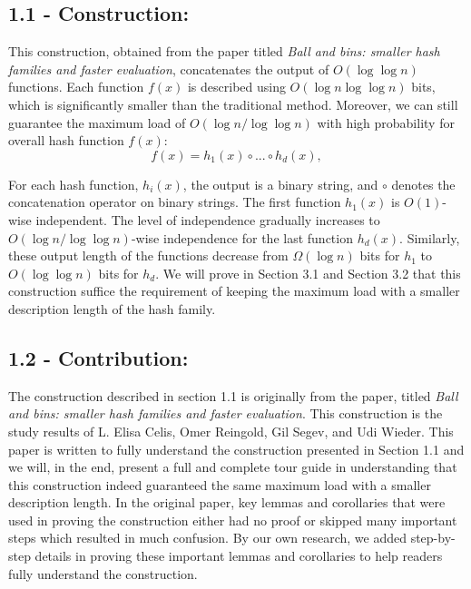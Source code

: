 \documentclass[a4paper, english]{paper}
\begin{document}
	\subsection{1.1 - Construction:}
\quad This construction, obtained from the paper  titled \textit{Ball and bins: smaller hash families and faster evaluation}, concatenates the output of  $O(\log \log n)$ functions. Each function $f(x)$ is described using $O(\log n \log\log n)$ bits, which is significantly smaller than the traditional method. Moreover, we can still guarantee the maximum load of $O(\log n/ \log \log n)$ with high probability for overall hash function $f(x)$:
			$$f(x) = h_1(x) \circ ... \circ h_d(x),$$\par
 For each hash function, $h_i(x)$, the output is a binary string, and $\circ$ denotes the concatenation operator on binary strings. The first function $h_1(x)$ is $O(1)$-wise independent. The level of independence gradually increases to $O(\log n/ \log \log n)$-wise independence for the last function $h_d(x)$. Similarly, these output length of the functions decrease from $\Omega(\log n)$ bits for $h_1$ to $O(\log\log n)$ bits for $h_d$. We will prove in Section 3.1 and Section 3.2 that this construction suffice the requirement of keeping the maximum load with a smaller description length of the hash family. \\
	
	\subsection{1.2 - Contribution:} 
\quad The construction described in section 1.1 is originally from the paper, titled \textit{Ball and bins: smaller hash families and faster evaluation}. This construction is the study results of L. Elisa Celis, Omer Reingold, Gil Segev, and Udi Wieder. This paper is written to fully understand the construction presented in Section 1.1 and we will, in the end, present a full and complete tour guide in understanding that this construction indeed guaranteed the same maximum load with a smaller description length. In the original paper, key lemmas and corollaries that were used in proving the construction either had no proof or skipped many important steps which resulted in much confusion. By our own research, we added step-by-step details in proving these important lemmas and corollaries to help readers fully understand the construction. \\
		
\end{document}
